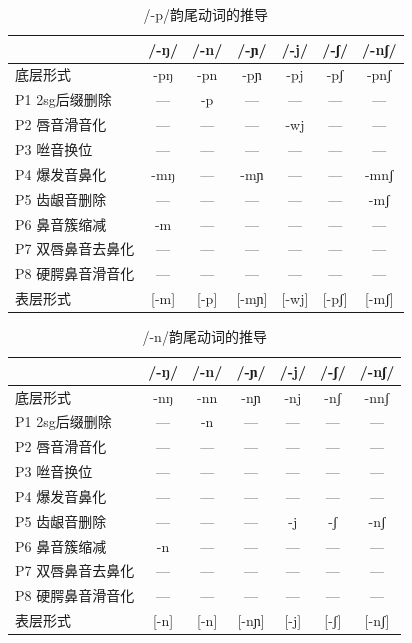 \begin{table}[H]
\vspace{5pt}
    \centering
    \caption{/-p/韵尾动词的推导}
    \label{deriv-p}
\setlength{\tabcolsep}{4pt}\small
\begin{tabular}{l|cccccc}
\toprule
            & /-ŋ/ & /-n/ & /-ɲ/ & /-j/ & /-ʃ/ & /-nʃ/ \\
\midrule
底层形式 & -pŋ & -pn & -pɲ & -pj & -pʃ & -pnʃ \\
P1 2sg后缀删除 & --- & -p & --- & --- & --- & --- \\
P2 唇音滑音化 & --- & --- & --- & -wj & --- & --- \\
P3 咝音换位 & --- & --- & --- & --- & --- & --- \\
P4 爆发音鼻化 & -mŋ & --- & -mɲ & --- & --- & -mnʃ \\
P5 齿龈音删除 & --- & --- & --- & --- & --- & -mʃ \\
P6 鼻音簇缩减 & -m & --- & --- & --- & --- & --- \\
P7 双唇鼻音去鼻化 & --- & --- & --- & --- & --- & --- \\
P8 硬腭鼻音滑音化 & --- & --- & --- & --- & --- & --- \\
\midrule
表层形式 & [-m] & [-p] & [-mɲ] & [-wj] & [-pʃ] & [-mʃ] \\
\bottomrule
\end{tabular}
\end{table}

\begin{table}[H]
\vspace{5pt}
    \centering
    \caption{/-n/韵尾动词的推导}
    \label{deriv-n}
\setlength{\tabcolsep}{4pt}\small
\begin{tabular}{l|cccccc}
\toprule
            & /-ŋ/ & /-n/ & /-ɲ/ & /-j/ & /-ʃ/ & /-nʃ/ \\
\midrule
底层形式 & -nŋ & -nn & -nɲ & -nj & -nʃ & -nnʃ \\
P1 2sg后缀删除 & --- & -n & --- & --- & --- & --- \\
P2 唇音滑音化 & --- & --- & --- & --- & --- & --- \\
P3 咝音换位 & --- & --- & --- & --- & --- & --- \\
P4 爆发音鼻化 & --- & --- & --- & --- & --- & --- \\
P5 齿龈音删除 & --- & --- & --- & -j & -ʃ & -nʃ \\
P6 鼻音簇缩减 & -n & --- & --- & --- & --- & --- \\
P7 双唇鼻音去鼻化 & --- & --- & --- & --- & --- & --- \\
P8 硬腭鼻音滑音化 & --- & --- & --- & --- & --- & --- \\
\midrule
表层形式 & [-n] & [-n] & [-nɲ] & [-j] & [-ʃ] & [-nʃ] \\
\bottomrule
\end{tabular}
\end{table}

